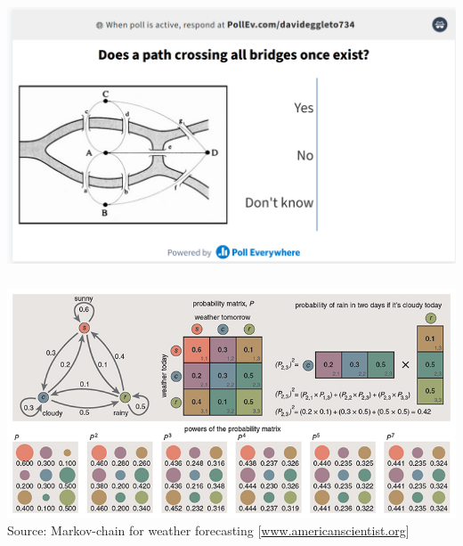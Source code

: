 \documentclass[8pt]{beamer}
\begin{document}

\begin{frame}

\frametitle{\insertsection}
\centering
\includegraphics[width=\linewidth, frame]{poll1}

\end{frame}


\begin{frame}
\frametitle{\insertsection}

\centering
\includegraphics[width=\linewidth,height=0.7\textheight,keepaspectratio]{markov}\\
\tiny{Source: Markov-chain for weather forecasting [\url{www.americanscientist.org}]}
	
\end{frame}

\end{document}
